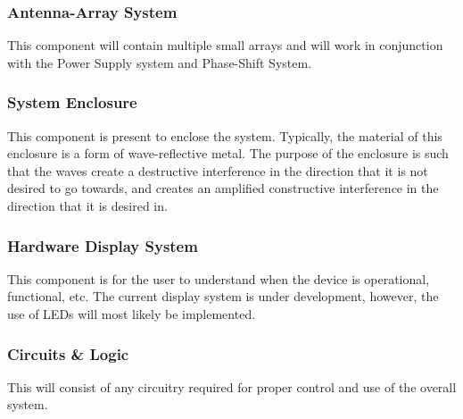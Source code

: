 \documentclass[12pt, titlepage]{article}
\begin{document}
\subsubsection{Antenna-Array System}
This component will contain multiple small arrays and will work in conjunction with the Power Supply system and Phase-Shift System.

\subsubsection{System Enclosure}
This component is present to enclose the system. Typically, the material of this enclosure is a form of wave-reflective metal. The purpose of the enclosure is such that the waves create a destructive interference in the direction that it is not desired to go towards, and creates an amplified constructive interference in the direction that it is desired in. 

\subsubsection{Hardware Display System}
This component is for the user to understand when the device is operational, functional, etc. The current display system is under development, however, the use of LEDs will most likely be implemented. 

\subsubsection{Circuits & Logic}
This will consist of any circuitry required for proper control and use of the overall system. 
\end{document}
